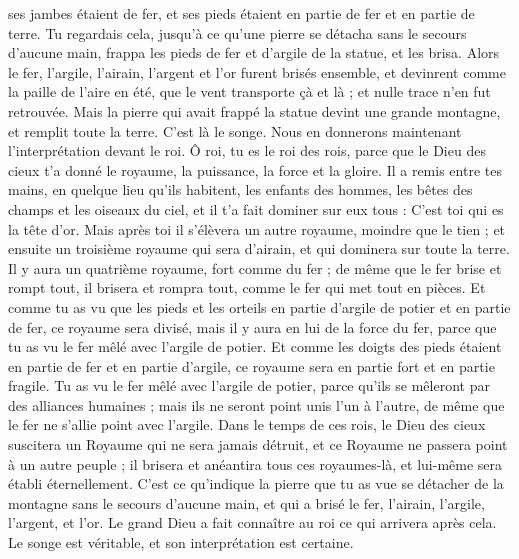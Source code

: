 \begin{multicols}{2}
ses jambes étaient de fer, et ses pieds étaient en partie de fer et en partie de terre.
Tu regardais cela, jusqu’à ce qu’une pierre se détacha sans le secours d’aucune main, frappa les pieds de fer et d’argile de la statue, et les brisa.
Alors le fer, l’argile, l'airain, l'argent et l'or furent brisés ensemble, et devinrent comme la paille de l'aire en été, que le vent transporte çà et là ; et nulle trace n’en fut retrouvée.  Mais la pierre qui avait frappé la statue devint une grande montagne, et remplit toute la terre.
C'est là le songe. Nous en donnerons maintenant l’interprétation devant le roi.
Ô roi, tu es le roi des rois, parce que le Dieu des cieux t'a donné le royaume, la puissance, la force et la gloire.
Il a remis entre tes mains, en quelque lieu qu’ils habitent, les enfants des hommes, les bêtes des champs et les oiseaux du ciel, et il t’a fait dominer sur eux tous : C’est toi qui es la tête d'or.
Mais après toi il s'élèvera un autre royaume, moindre que le tien ; et ensuite un troisième royaume qui sera d'airain, et qui dominera sur toute la terre.
Il y aura un quatrième royaume, fort comme du fer ; de même que le fer brise et rompt tout, il brisera et rompra tout, comme le fer qui met tout en pièces.
Et comme tu as vu que les pieds et les orteils en partie d’argile de potier et en partie de fer, ce royaume sera divisé, mais il y aura en lui de la force du fer, parce que tu as vu le fer mêlé avec l’argile de potier.
Et comme les doigts des pieds étaient en partie de fer et en partie d’argile, ce royaume sera en partie fort et en partie fragile.
Tu as vu le fer mêlé avec l’argile de potier, parce qu'ils se mêleront par des alliances humaines ; mais ils ne seront point unis l’un à l'autre, de même que le fer ne s’allie point avec l’argile.
Dans le temps de ces rois, le Dieu des cieux suscitera un Royaume qui ne sera jamais détruit, et ce Royaume ne passera point à un autre peuple ; il brisera et anéantira tous ces royaumes-là, et lui-même sera établi éternellement.
C’est ce qu’indique la pierre que tu as vue se détacher de la montagne sans le secours d’aucune main, et qui a brisé le fer, l'airain, l’argile, l'argent, et l'or. Le grand Dieu a fait connaître au roi ce qui arrivera après cela. Le songe est véritable, et son interprétation est certaine.

\end{multicols}
